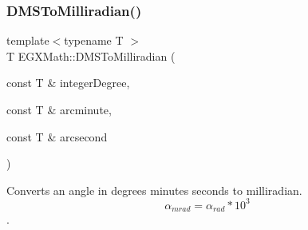 \mbox{\label{group___e_g_x_math-_angle_conversions-_d_m_s_ga64258049da06b11e8ec77108ea80de82}} 
\subsubsection{\texorpdfstring{D\+M\+S\+To\+Milliradian()}{DMSToMilliradian()}}
{\footnotesize\ttfamily template$<$typename T $>$ \\
T E\+G\+X\+Math\+::\+D\+M\+S\+To\+Milliradian (\begin{DoxyParamCaption}\item[{const T \&}]{integer\+Degree,  }\item[{const T \&}]{arcminute,  }\item[{const T \&}]{arcsecond }\end{DoxyParamCaption})}



Converts an angle in degrees minutes seconds to milliradian. \[\alpha_{mrad}=\alpha_{rad}*10^3\]. 

